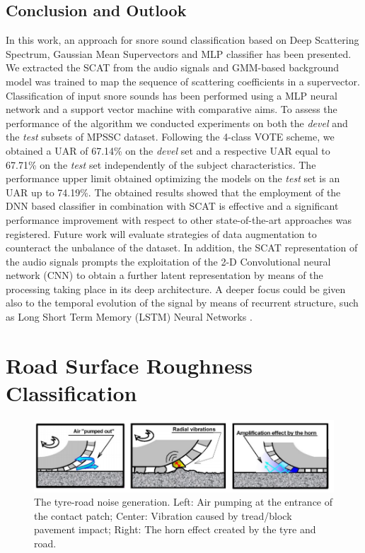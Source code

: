 \subsection{Conclusion and Outlook}
\label{section:concl}

In this work, an approach for snore sound classification based on Deep Scattering Spectrum, Gaussian Mean Supervectors and MLP classifier has been presented. We extracted the SCAT from the audio signals and GMM-based background model was trained to map the sequence of scattering coefficients in a supervector. Classification of input snore sounds has been performed using a MLP neural network and a support vector machine with comparative aims. To assess the performance of the algorithm we conducted experiments on both the \textit{devel} and the \textit{test} subsets of MPSSC dataset.
Following the 4-class VOTE scheme, we obtained a UAR of 67.14\% on the \textit{devel} set and a respective UAR equal to 67.71\% on the \textit{test} set independently of the subject characteristics. 
The performance upper limit obtained optimizing the models on the \textit{test} set is an UAR up to 74.19\%.
The obtained results showed that the employment of the DNN based classifier in combination with SCAT is effective and a significant performance improvement with respect to other state-of-the-art approaches was registered. 
Future work will evaluate strategies of data augmentation to counteract the unbalance of the dataset. In addition, the SCAT representation of the audio signals prompts the exploitation of the 2-D Convolutional neural network (CNN) to obtain a further latent representation by means of the processing taking place in its deep architecture.
A deeper focus could be given also to the temporal evolution of the signal by means of recurrent structure, such as Long Short Term Memory (LSTM) Neural Networks \cite{graves2005framewise}. 
\newpage





\newpage
\section{Road Surface Roughness Classification}
\label{sec:road_classification}
	\begin{figure}[h]
		\centering
		\includegraphics[width=\textwidth]{img/pompaevibrazionihorn.png}
		\caption[Tyre-Road Noises]{The tyre-road noise generation. Left:  Air pumping at the entrance of the contact patch; Center: Vibration caused by tread/block pavement impact; Right: The horn effect created by the tyre and road.}
		\label{fig:tyre-road-noise}
	\end{figure}

